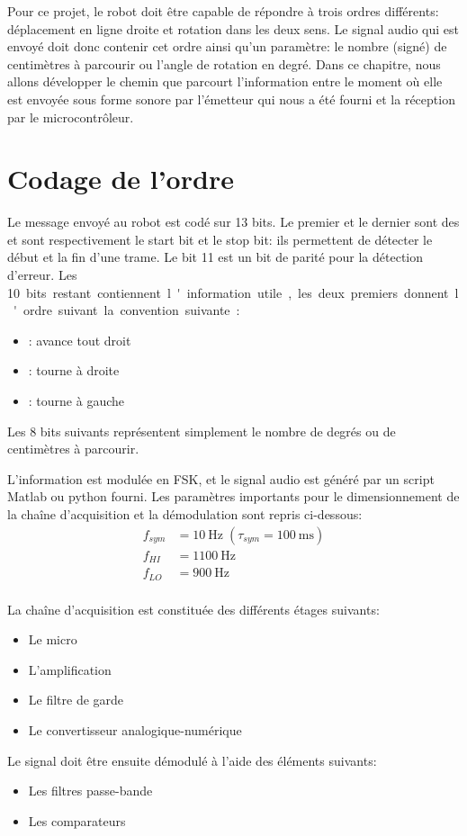 Pour ce projet, le robot doit être capable de répondre à trois ordres différents: déplacement en ligne droite et rotation dans les deux sens. Le signal audio qui est envoyé doit donc contenir cet ordre ainsi qu'un paramètre: le nombre (signé) de centimètres à parcourir ou l'angle de rotation en degré. Dans ce chapitre, nous allons développer le chemin que parcourt l'information entre le moment où elle est envoyée sous forme sonore par l'émetteur qui nous a été fourni et la réception par le microcontrôleur.

\section{Codage de l'ordre}
Le message envoyé au robot est codé sur 13 bits. Le premier et le dernier sont des  et sont respectivement le start bit et le stop bit: ils permettent de détecter le début et la fin d'une trame. Le bit 11 est un bit de parité pour la détection d'erreur. Les \SI{10} bits restant contiennent l'information utile, les deux premiers donnent l'ordre suivant la convention suivante :
\begin{itemize}
\item {} : avance tout droit
\item {} : tourne à droite
\item {} : tourne à gauche
\end{itemize}
Les 8 bits suivants représentent simplement le nombre de degrés ou de centimètres à parcourir.

L'information est modulée en FSK, et le signal audio est généré par un script Matlab ou python fourni. Les paramètres importants pour le dimensionnement de la chaîne d'acquisition et la démodulation sont repris ci-dessous:
\begin{align*}
f_{sym} &= \SI{10}{\hertz} \;(\tau_{sym} = \SI{100}{\milli\second})\\
f_{HI} &= \SI{1100}{\hertz}\\
f_{LO} &= \SI{900}{\hertz}\\
\end{align*}

La chaîne d'acquisition est constituée des différents étages suivants:
\begin{itemize}
\item Le micro
\item L'amplification
\item Le filtre de garde
\item Le convertisseur analogique-numérique
\end{itemize}
Le signal doit être ensuite démodulé à l'aide des éléments suivants:
\begin{itemize}
\item Les filtres passe-bande
\item Les comparateurs
\end{itemize}

